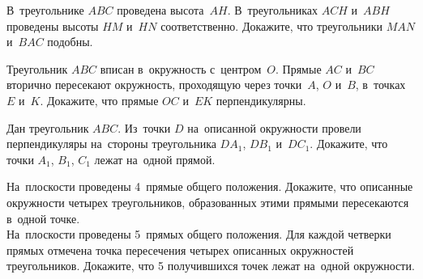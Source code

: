 \begin{problems}
\item
В~треугольнике $ABC$ проведена высота~$AH$.
В~треугольниках $ACH$ и~$ABH$ проведены высоты $HM$ и~$HN$ соответственно.
Докажите, что треугольники $MAN$ и~$BAC$ подобны.

\item
Треугольник $ABC$ вписан в~окружность с~центром~$O$.
Прямые $AC$ и~$BC$ вторично пересекают окружность, проходящую через точки~$A$,
$O$ и~$B$, в~точках $E$ и~$K$.
Докажите, что прямые $OC$ и~$EK$ перпендикулярны.

\item
Дан треугольник $ABC$.
Из~точки $D$ на~описанной окружности провели перпендикуляры на~стороны
треугольника $D A_1$, $D B_1$ и~$D C_1$.
Докажите, что точки $A_1$, $B_1$, $C_1$ лежат на~одной прямой.

\item
\subproblem
На~плоскости проведены 4~прямые общего положения.
Докажите, что описанные окружности четырех треугольников, образованных этими
прямыми пересекаются в~одной точке.
\\
\subproblem
На~плоскости проведены 5~прямых общего положения.
Для каждой четверки прямых отмечена точка пересечения четырех описанных
окружностей треугольников.
Докажите, что 5 получившихся точек лежат на~одной окружности.

\end{problems}

